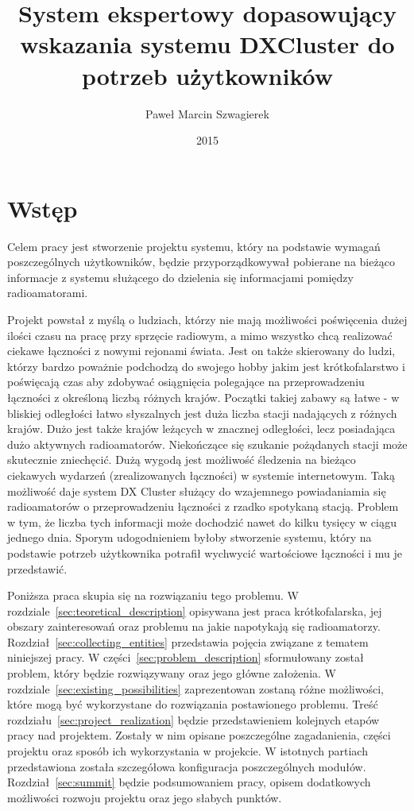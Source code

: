 \documentclass[]{mgr}
\title{System ekspertowy dopasowujący wskazania systemu DXCluster do potrzeb użytkowników}
\author{Paweł Marcin Szwagierek}
\date{2015}
\begin{document}
    
    \maketitle

    \tableofcontents

    \chapter{Wstęp}
    Celem pracy jest stworzenie projektu systemu, który na podstawie wymagań poszczególnych użytkowników, będzie przyporządkowywał pobierane na bieżąco informacje z systemu służącego do dzielenia się informacjami pomiędzy radioamatorami.

    Projekt powstał z myślą o ludziach, którzy nie mają możliwości poświęcenia dużej ilości czasu na pracę przy sprzęcie radiowym, a mimo wszystko chcą realizować ciekawe łączności z nowymi rejonami świata. Jest on także skierowany do ludzi, którzy bardzo poważnie podchodzą do swojego hobby jakim jest krótkofalarstwo i poświęcają czas aby zdobywać osiągnięcia polegające na przeprowadzeniu łączności z określoną liczbą różnych krajów. Początki takiej zabawy są łatwe - w bliskiej odległości łatwo słyszalnych jest duża liczba stacji nadających z różnych krajów. Dużo jest także krajów leżących w znacznej odległości, lecz posiadająca dużo aktywnych radioamatorów. Niekończące się szukanie pożądanych stacji może skutecznie zniechęcić. Dużą wygodą jest możliwość śledzenia na bieżąco ciekawych wydarzeń (zrealizowanych łączności) w systemie internetowym. Taką możliwość daje system DX Cluster służący do wzajemnego powiadaniamia się radioamatorów o przeprowadzeniu łączności z rzadko spotykaną stacją. Problem w tym, że liczba tych informacji może dochodzić nawet do kilku tysięcy w ciągu jednego dnia. Sporym udogodnieniem byłoby stworzenie systemu, który na podstawie potrzeb użytkownika potrafił wychwycić wartościowe łączności i mu je przedstawić.

    Poniższa praca skupia się na rozwiązaniu tego problemu. W rozdziale~\ref{sec:teoretical_description} opisywana jest praca krótkofalarska, jej obszary zainteresowań oraz problemu na jakie napotykają się radioamatorzy. Rozdział~\ref{sec:collecting_entities} przedstawia pojęcia związane z tematem niniejszej pracy. W części~\ref{sec:problem_description} sformułowany został problem, który będzie rozwiązywany oraz jego główne założenia. W rozdziale~\ref{sec:existing_possibilities} zaprezentowan zostaną różne możliwości, które mogą być wykorzystane do rozwiązania postawionego problemu. Treść rozdziału~\ref{sec:project_realization} będzie przedstawieniem kolejnych etapów pracy nad projektem. Zostały w nim opisane poszczególne zagadanienia, części projektu oraz sposób ich wykorzystania w projekcie. W istotnych partiach przedstawiona została szczegółowa konfiguracja poszczególnych modułów. Rozdział~\ref{sec:summit} będzie podsumowaniem pracy, opisem dodatkowych możliwości rozwoju projektu oraz jego słabych punktów.
\end{document}
